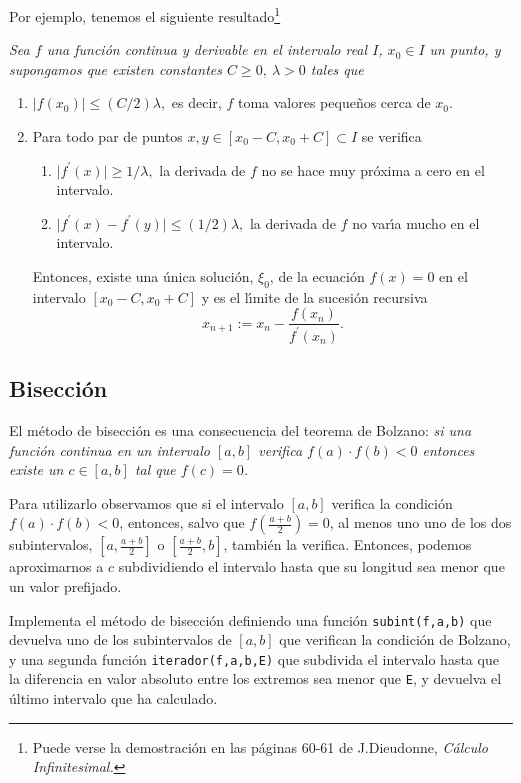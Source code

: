 Por ejemplo, tenemos el siguiente resultado\footnote{Puede verse la
demostraci\'on en las p\'aginas 60-61 de J.Dieudonne, {\itshape C\'alculo
Infinitesimal.}}

{\itshape Sea $f$ una funci\'on continua y derivable en el intervalo real $I$,
$x_0\in I$ un punto,  y supongamos que existen constantes $C\ge 0,\ \lambda>0$
tales que 
\begin{enumerate}
 \item $\vert f(x_0)\vert \le (C/2)\lambda,$ es decir, $f$ toma valores
peque\~nos cerca de $x_0$. 
 \item Para todo par de puntos $x,y\in [x_0-C,x_0+C]\subset I$ se verifica
 \begin{enumerate}
  \item $\vert f^{\prime}(x)\vert\ge 1/\lambda,$ la derivada de $f$ no se hace
muy pr\'oxima a cero en el intervalo.
  \item $\vert f^{\prime}(x)-f^{\prime}(y)\vert\le (1/2)\lambda, $ la derivada
de $f$ no var\'{\i}a mucho en el intervalo. 
 \end{enumerate}
Entonces, existe una \'unica soluci\'on,  $\xi_0$, de la ecuaci\'on $f(x)=0$ en
el intervalo $[x_0-C,x_0+C]$ y es el l\'{\i}mite de la sucesi\'on recursiva 
\[x_{n+1}:=x_n-\frac{f(x_n)}{f^{\prime}(x_n)}.\]
\end{enumerate}
}




\subsection{Bisecci\'on}

El m\'etodo de bisecci\'on es una consecuencia del teorema de Bolzano: {\itshape
si una funci\'on continua en un intervalo $[a,b]$ verifica $f(a)\cdot f(b)<0$
entonces existe un $c\in [a,b]$ tal que $f(c)=0$. }

Para utilizarlo observamos que si el intervalo $[a,b]$ verifica la condici\'on
$f(a)\cdot f(b)<0$, entonces, salvo que $f(\frac{a+b}{2})=0$,  al menos uno uno
de los dos subintervalos, $[a,\frac{a+b}{2}]$ o $[\frac{a+b}{2},b]$, tambi\'en
la verifica. Entonces, podemos aproximarnos a $c$ subdividiendo el intervalo
hasta que su longitud  sea menor que un valor prefijado. 



\begin{ejer}
 
 Implementa el m\'etodo de bisecci\'on definiendo una funci\'on
\lstinline|subint(f,a,b)| que devuelva uno de los  subintervalos de $[a,b]$ que
verifican la condici\'on de Bolzano, y una segunda funci\'on
\lstinline|iterador(f,a,b,E)| que subdivida el intervalo hasta que la diferencia
en valor absoluto entre los extremos sea menor que \lstinline$E$, y devuelva 
el \'ultimo intervalo que ha calculado.
\end{ejer}


